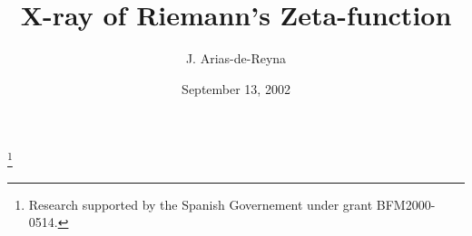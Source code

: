 \documentclass[a4paper]{amsart}
\numberwithin{equation}{section}
\begin{document}
\title[X-Ray of Riemann's Zeta-function]%
   {X-ray of Riemann's Zeta-function}
\author{J. Arias-de-Reyna}
\address{Facultad de Matemticas\\
    Universidad de Sevilla \\
    P.~O.~box 1160\\
    41080-Seville\\
    Spain}
\thanks{Research supported by the Spanish Governement under grant BFM2000-0514.}
\date{September 13, 2002}

\maketitle
\end{document}
